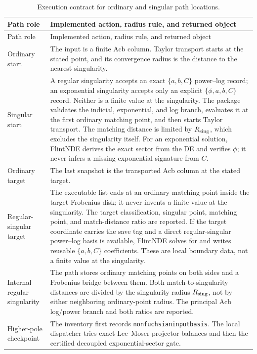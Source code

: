 \documentclass[11pt]{article}
\renewcommand{\_}{\origunderscore\allowbreak}
\begin{document}
\small
\begin{longtable}{L{0.22\textwidth}L{0.72\textwidth}}
\caption{Execution contract for ordinary and singular path locations.}
\label{tab:path-location-contract}\\
\toprule
Path role & Implemented action, radius rule, and returned object \\
\midrule
\endfirsthead
\toprule
Path role & Implemented action, radius rule, and returned object \\
\midrule
\endhead
Ordinary start & The input is a finite Acb column.  Taylor transport starts at the stated
point, and its convergence radius is the distance to the nearest singularity. \\
Singular start & A regular singularity accepts an exact $\{a,b,C\}$ power--log record;
an exponential singularity accepts only an explicit $\{\phi,a,b,C\}$ record.  Neither is
a finite value at the singularity.  The package validates the indicial, exponential, and log
branch, evaluates it at the first ordinary matching point, and then starts Taylor transport.
The matching distance is limited by $R_{\rm sing}$, which excludes the singularity itself.
For an exponential solution, FlintNDE derives the exact sector from the DE and verifies
$\phi$; it never infers a missing exponential signature from $C$. \\
Ordinary target & The last snapshot is the transported Acb column at the stated target. \\
Regular-singular target & The executable list ends at an ordinary matching point inside the
target Frobenius disk; it never invents a finite value at the singularity.  The target
classification, singular point, matching point, and match-distance ratio are reported.  If
the target coordinate carries the save tag and a direct regular-singular power--log basis is
available, FlintNDE solves for and writes reusable $\{a,b,C\}$ coefficients.  These are local
boundary data, not a finite value at the singularity. \\
Internal regular singularity & The path stores ordinary matching points on both sides and a
Frobenius bridge between them.  Both match-to-singularity distances are divided by the
singularity radius $R_{\rm sing}$, not by either neighboring ordinary-point radius.  The
principal Acb log/power branch and both ratios are reported. \\
Higher-pole checkpoint & The inventory first records
\texttt{non\_fuchsian\_input\_basis}.  The local dispatcher tries exact Lee--Moser
projector balances and then the certified decoupled exponential-sector gate.

\end{longtable}
\end{document}
